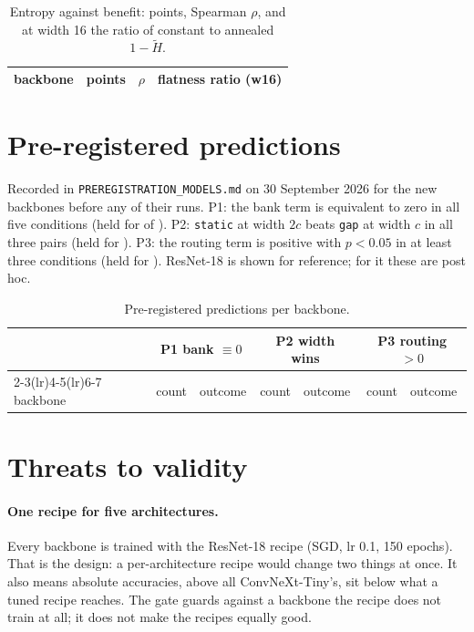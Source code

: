 \documentclass[10pt,a4paper]{article}
\begin{document}
\begin{table}[h]\centering\small
\caption{Entropy against benefit: points, Spearman $\rho$, and at width 16
the ratio of constant to annealed $1-\tilde H$.}
\label{tab:xent}
\begin{tabular}{l r r r}
\toprule
backbone & points & $\rho$ & flatness ratio (w16) \\
\midrule
\bottomrule
\end{tabular}
\end{table}

\section{Pre-registered predictions}

Recorded in \texttt{PREREGISTRATION\_MODELS.md} on 30 September 2026 for
the  new backbones before any of their runs. P1: the bank term is
equivalent to zero in all five conditions (held for  of
). P2: \texttt{static} at width $2c$ beats \texttt{gap} at width
$c$ in all three pairs (held for ). P3: the routing term is
positive with $p<0.05$ in at least three conditions (held for
). ResNet-18 is shown for reference; for it these are post hoc.

\begin{table}[h]\centering\small
\caption{Pre-registered predictions per backbone.}
\label{tab:xprereg}
\begin{tabular}{l rl rl rl}
\toprule
& \multicolumn{2}{c}{P1 bank $\equiv 0$} & \multicolumn{2}{c}{P2 width wins} & \multicolumn{2}{c}{P3 routing $>0$} \\
\cmidrule(lr){2-3}\cmidrule(lr){4-5}\cmidrule(lr){6-7}
backbone & count & outcome & count & outcome & count & outcome \\
\midrule
\bottomrule
\end{tabular}
\end{table}

\section{Threats to validity}

\paragraph{One recipe for five architectures.} Every backbone is trained
with the ResNet-18 recipe (SGD, lr 0.1, 150 epochs). That is the design:
a per-architecture recipe would change two things at once. It also means
absolute accuracies, above all ConvNeXt-Tiny's, sit below what a tuned
recipe reaches. The gate guards against a backbone the recipe does not
train at all; it does not make the recipes equally good.
\end{document}
